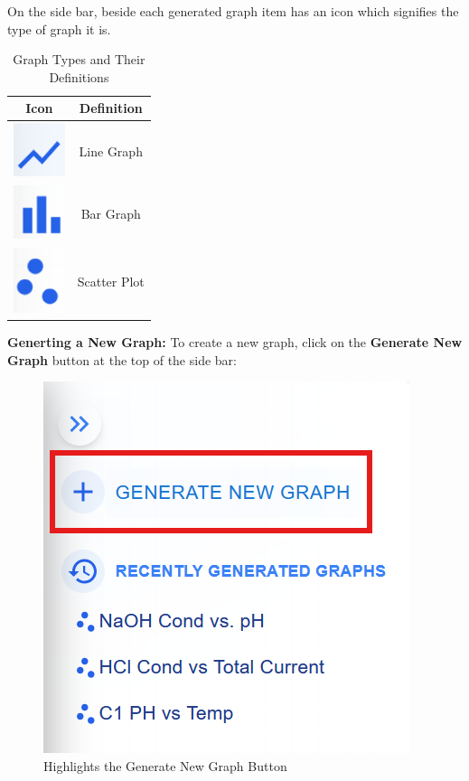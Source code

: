 \documentclass[12pt]{article}
\begin{document}
On the side bar, beside each generated graph item has an icon which signifies
the type of graph it is. 
\begin{table}[H]
    \centering
    \begin{tabular}{|c|c|}
        \hline
         \textbf{Icon} & \textbf{Definition} \\
        \hline
        \includegraphics[width=1.5cm]{./Diagrams/graph-line.png} & Line Graph \\
        \hline
        \includegraphics[width=1.5cm]{./Diagrams/graph-bar.png} & Bar Graph \\
        \hline
        \includegraphics[width=1.5cm]{./Diagrams/graph-scatter.png} & Scatter Plot \\
        \hline
    \end{tabular}
    \caption{Graph Types and Their Definitions}
    \label{tab:graphs}
\end{table}

\noindent \textbf{Generting a New Graph:} \newline
To create a new graph, click on the \textbf{Generate New Graph} button at the top of the side bar:
\begin{figure}[H]
    \centering
    \includegraphics[scale=1]{./Diagrams/graph-newgraph .png}
    \caption{Highlights the Generate New Graph Button}
    \label{fig:example}
\end{figure}
\end{document}
